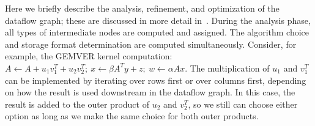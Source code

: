 \documentclass[runningheads]{llncs}
\begin{document}
%

Here we briefly describe the analysis, refinement, and optimization of the
dataflow graph; these are discussed in more detail in~\cite{Siek}. 
During the analysis phase, all types of intermediate nodes are computed and
assigned. The algorithm choice and storage format determination are computed
simultaneously.  Consider, for example, the GEMVER kernel computation:   
$A \gets A + u_1 v_1^T + u_2 v_2^T;~
  x \gets \beta A^T y + z;~
  w \gets \alpha A x$.
The multiplication of $u_1$ and $v_1^T$ can be implemented by iterating over 
rows first or over columns first, depending on how the result is used
downstream in the dataflow graph.  In this case, the result is added to the
outer product of $u_2$ and $v_2^T$, so we still can choose either option as
long as we make the same choice for both outer products.
\end{document}
